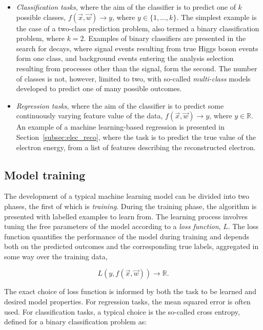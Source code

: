 \begin{itemize}
    \item \textit{Classification tasks}, where the aim of the classifier is to predict one of $k$ possible classes,  $f(\vec{x},\vec{w})\rightarrow y$, where $y\in\{1, ..., k\}$. The simplest example is the case of a two-class prediction problem, also termed a binary classification problem, where $k=2$. Examples of binary classifiers are presented in the search for \Hee decays, where signal events resulting from true Higgs boson events form one class, and background events entering the analysis selection resulting from processes other than the signal, form the second. The number of classes is not, however, limited to two, with so-called \textit{multi-class} models developed to predict one of many possible outcomes.
    \item \textit{Regression tasks}, where the aim of the classifier is to predict some continuously varying feature value of the data, $f(\vec{x},\vec{w})\rightarrow y$, where $y\in\mathbb{R}$. An example of a machine learning-based regression is presented in Section~\ref{subsec:elec_reco}, where the task is to predict the true value of the electron energy, from a list of features describing the reconstructed electron. 
\end{itemize}

\subsection{Model training}
\label{subsec:ML_model_training}

The development of a typical machine learning model can be divided into two phases, the first of which is \textit{training}. During the training phase, the algorithm is presented with labelled examples to learn from. The learning process involves tuning the free parameters of the model according to a \textit{loss function}, $L$. The loss function quantifies the performance of the model during training and depends both on the predicted outcomes and the corresponding true labels, aggregated in some way over the training data,

$$L(y,f(\vec{x},\vec{w})) \rightarrow \mathbb{R}.$$

\noindent The exact choice of loss function is informed by both the task to be learned and desired model properties. For regression tasks, the mean squared error is often used. For classification tasks, a typical choice is the so-called cross entropy, defined for a binary classification problem as:


